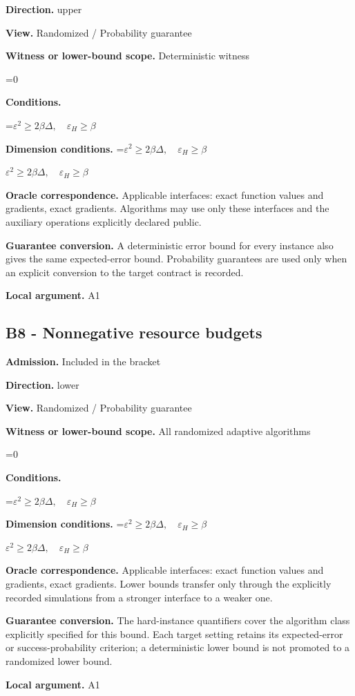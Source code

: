 \documentclass[10pt,a4paper]{article}
\newcommand{\AtlasMath}[1]{\par\begingroup\centering\setbox0=\hbox{$\displaystyle #1$}\ifdim\wd0>1.4\linewidth\typeout{ATLAS WIDE FORMULA: \the\wd0}\fi\ifdim\wd0>\linewidth\resizebox{\linewidth}{!}{\box0}\else\box0\fi\par\endgroup}
\newcommand{\AtlasInlineMath}[1]{\begingroup\setbox0=\hbox{$#1$}\ifdim\wd0>.4\linewidth\endgroup\AtlasMath{#1}\else\endgroup$#1$\fi}
\begin{document}
\textbf{Direction.} upper

\textbf{View.} Randomized / Probability guarantee

\textbf{Witness or lower-bound scope.} Deterministic witness

\AtlasMath{0}
\textbf{Conditions.} 
\AtlasMath{\varepsilon^2\ge2\beta\Delta,\quad\varepsilon_H\ge\beta}


\textbf{Dimension conditions.} \AtlasInlineMath{\varepsilon^2\ge2\beta\Delta,\quad\varepsilon_H\ge\beta}

\textbf{Oracle correspondence.} Applicable interfaces: exact function values and gradients, exact gradients. Algorithms may use only these interfaces and the auxiliary operations explicitly declared public.

\textbf{Guarantee conversion.} A deterministic error bound for every instance also gives the same expected-error bound. Probability guarantees are used only when an explicit conversion to the target contract is recorded.

\textbf{Local argument.} A1

\subsection{B8 - Nonnegative resource budgets}
\textbf{Admission.} Included in the bracket

\textbf{Direction.} lower

\textbf{View.} Randomized / Probability guarantee

\textbf{Witness or lower-bound scope.} All randomized adaptive algorithms

\AtlasMath{0}
\textbf{Conditions.} 
\AtlasMath{\varepsilon^2\ge2\beta\Delta,\quad\varepsilon_H\ge\beta}


\textbf{Dimension conditions.} \AtlasInlineMath{\varepsilon^2\ge2\beta\Delta,\quad\varepsilon_H\ge\beta}

\textbf{Oracle correspondence.} Applicable interfaces: exact function values and gradients, exact gradients. Lower bounds transfer only through the explicitly recorded simulations from a stronger interface to a weaker one.

\textbf{Guarantee conversion.} The hard-instance quantifiers cover the algorithm class explicitly specified for this bound. Each target setting retains its expected-error or success-probability criterion; a deterministic lower bound is not promoted to a randomized lower bound.

\textbf{Local argument.} A1
\end{document}
